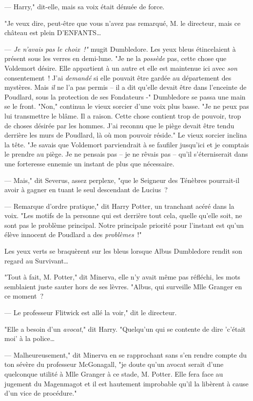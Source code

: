 --- Harry," dit-elle, mais sa voix était dénuée de force.

"Je veux dire, peut-être que vous n'avez pas remarqué, M. le directeur, mais ce château est plein D'ENFANTS…

--- \emph{Je n'avais pas le choix~!"} mugit Dumbledore. Les yeux bleus étincelaient à présent sous les verres en demi-lune. "Je ne la \emph{possède} pas, cette chose que Voldemort désire. Elle appartient à un autre et elle est maintenue ici avec \emph{son} consentement~! J'ai \emph{demandé} si elle pouvait être gardée au département des mystères. Mais \emph{il} ne l'a pas permis -- il a dit qu'elle devait être dans l'enceinte de Poudlard, sous la protection de ses Fondateurs -" Dumbledore se passa une main se le front. "Non," continua le vieux sorcier d'une voix plus basse. "Je ne peux pas lui transmettre le blâme. Il a raison. Cette chose contient trop de pouvoir, trop de choses désirée par les hommes. J'ai reconnu que le piège devait être tendu derrière les murs de Poudlard, là où mon pouvoir réside." Le vieux sorcier inclina la tête. "Je savais que Voldemort parviendrait à se faufiler jusqu'ici et je comptais le prendre au piège. Je ne pensais pas -- je ne rêvais pas -- qu'il s'éterniserait dans une forteresse ennemie un instant de plus que nécessaire.

--- Mais," dit Severus, assez perplexe, "que le Seigneur des Ténèbres pourrait-il avoir à gagner en tuant le seul descendant de Lucius~?

--- Remarque d'ordre pratique," dit Harry Potter, un tranchant acéré dans la voix. "Les motifs de la personne qui est derrière tout cela, quelle qu'elle soit, ne sont pas le problème principal. Notre principale priorité pour l'instant est qu'un élève innocent de Poudlard a des \emph{problèmes}~!"

Les yeux verts se braquèrent sur les bleus lorsque Albus Dumbledore rendit son regard au Survivant…

"Tout à fait, M. Potter," dit Minerva, elle n'y avait même pas réfléchi, les mots semblaient juste sauter hors de ses lèvres. "Albus, qui surveille Mlle Granger en ce moment~?

--- Le professeur Flitwick est allé la voir," dit le directeur.

"Elle a besoin d'un \emph{avocat}," dit Harry. "Quelqu'un qui se contente de dire 'c'était moi' à la police…

--- Malheureusement," dit Minerva en se rapprochant sans s'en rendre compte du ton sévère du professeur McGonagall, "je doute qu'un avocat serait d'une quelconque utilité à Mlle Granger à ce stade, M. Potter. Elle fera face au jugement du Magenmagot et il est hautement improbable qu'il la libèrent à cause d'un vice de procédure."

